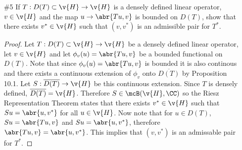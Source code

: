 \documentclass[11pt, oneside]{article}
\begin{document}
\begin{enumerate}
\begin{proof}
      Finally I will prove Proposition 11.1.
      Let $T:D(T) \subset \v{H} \to \v{H}$ be a closed linear operator.
      Consider the graph of $T$.
      Obviously $G(T)$ is a subspace because $T$ is linear.
      Since $T0 = 0$, this implies that $(0, 0) \in G(T)$.
      Let $(u_1, v_1), (u_2, v_2) \in G(T)$, then $Tu_1 = v_1$, $Tu_2 = v_2$,
      and $T(c_1 u_1 + c_2 u_2) = c_1 v_1 + c_2 v_2$ for any scalars $c_1, c_2$.
      This shows that $c_1(u_1, v_1) + c_2(u_2, v_2) \in G(T)$, and therefore
      $G(T)$ is a subspace.
      Now let $(u_n, v_n) \in G(T)$ be a convergent sequence, that is
      $(u_n, v_n) \to (u, v)$.
      Since $(u_n, v_n) \in G(T)$ this implies that $u_n \in D(T)$ and
      $v_n = Tu_n$.
      Also since $(u_n, v_n) \to (u, v)$ this implies that $u_n \to u$ and
      $v_n = Tu_n \to v$.
      Therefore since $T$ is closed this implies that $u \in D(T)$ and $Tu = v$.
      This shows that $(u, v) \in G(T)$, and thus $G(T)$ is closed.

      Let $T:D(T) \subset \v{H} \to \v{H}$ be a linear operator and let $G(T)$,
      the graph of $T$, be a closed subspace.
      Let $u_n \in D(T)$, such that $u_n \to u$ and $Tu_n \to v$.
      This implies that $(u_n, Tu_n) \in G(T)$ and that $(u_n, Tu_n) \to (u, v)$.
      Since $G(T)$ is closed this implies that $(u, v) \in G(T)$, and thus
      $u \in D(T)$ and $Tu = v$.
      Therefore $T$ is a closed operator.
    \end{proof}

  \pagebreak
  \item[\#5] %
    If $T: D(T) \subset \v{H} \to \v{H}$ is a densely defined linear operator,
    $v \in \v{H}$ and the map $u \to \abr{Tu, v}$ is bounded on $D(T)$, show
    that there exists $v^* \in \v{H}$ such that $(v, v^*)$ is an admissible pair
    for $T^*$.

    \begin{proof}
      Let $T:D(T) \subset \v{H} \to \v{H}$ be a densely defined linear
      operator, let $v \in \v{H}$ and let $\phi_v(u) = \abr{Tu, v}$ be a bounded
      functional on $D(T)$.
      Note that since $\phi_v(u) = \abr{Tu, v}$ is bounded it is also continous
      and there exists a continuous extension of $\phi_v$ onto
      $\overline{D(T)}$ by Proposition 10.1.
      Let $S:\overline{D(T)} \to \v{H}$ be this continuous extension.
      Since $T$ is densely defined, $\overline{D(T)} = \v{H}$.
      Therefore $S \in \mcB(\v{H}, \CC)$ so the Riesz Representation Theorem
      states that there exists $v^* \in \v{H}$ such that $Su = \abr{u, v^*}$ for
      all $u \in \v{H}$.
      Now note that for $u \in D(T)$, $Su = \abr{Tu, v}$ and $Su = \abr{u, v^*}$,
      therefore $\abr{Tu, v} = \abr{u, v^*}$.
      This implies that $(v, v^*)$ is an admissable pair for $T^*$.
    \end{proof}


\end{enumerate}
\end{document}
